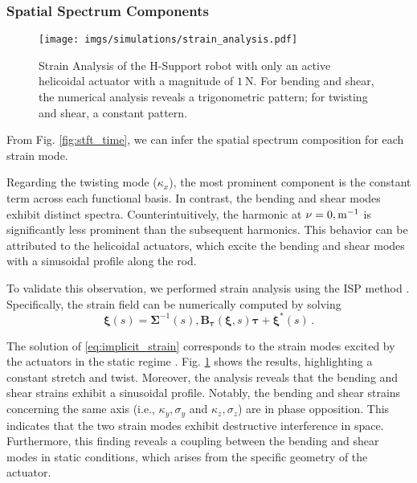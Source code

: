     \subsubsection{Spatial Spectrum Components}
    \begin{figure}
        \centering
        \texttt{[image: imgs/simulations/strain\_analysis.pdf]}
        \caption{Strain Analysis of the H-Support robot with only an active helicoidal actuator with a magnitude of $\SI{1}{\newton}$. For bending and shear, the numerical analysis reveals a trigonometric pattern; for twisting and shear, a constant pattern.}
        \label{fig:strain_analysis}
    \end{figure}
    From Fig. \ref{fig:stft_time}, we can infer the spatial spectrum composition for each strain mode.

    Regarding the twisting mode ($\kappa_x$), the most prominent component is the constant term across each functional basis.
    In contrast, the bending and shear modes exhibit distinct spectra. Counterintuitively, the harmonic at $\nu = 0 , \textnormal{m}^{-1}$ is significantly less prominent than the subsequent harmonics. This behavior can be attributed to the helicoidal actuators, which excite the bending and shear modes with a sinusoidal profile along the rod.
    
    To validate this observation, we performed strain analysis using the \ac{ISP} method \cite{renda2020geometric, renda2024dynamics}. Specifically, the strain field can be numerically computed by solving
    \begin{equation} \label{eq:implicit_strain} 
        \bm{\xi}(s) = \bm{\Sigma}^{-1}(s) , \bm{B}_{\bm{\tau}}\left(\bm{\xi}, s\right) \bm{\tau} + \bm{\xi}^{*}(s) \, . 
    \end{equation}
    
    The solution of \eqref{eq:implicit_strain} corresponds to the strain modes excited by the actuators in the static regime \cite{renda2020geometric}.
    Fig. \ref{fig:strain_analysis} shows the results, highlighting a constant stretch and twist. Moreover, the analysis reveals that the bending and shear strains exhibit a sinusoidal profile. Notably, the bending and shear strains concerning the same axis (i.e., $\kappa_y, \sigma_y$ and $\kappa_z, \sigma_z$) are in phase opposition. This indicates that the two strain modes exhibit destructive interference in space. Furthermore, this finding reveals a coupling between the bending and shear modes in static conditions, which arises from the specific geometry of the actuator.

